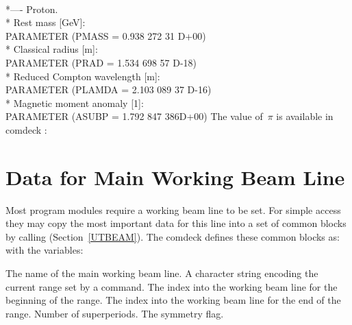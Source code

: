 {      \>\\
{*}---- \>Proton.\\
{*}     \>Rest mass [GeV]:\\
      \>PARAMETER         (PMASS  = 0.938 272 31 D+00)\\
{*}     \>Classical radius [m]:\\
      \>PARAMETER         (PRAD   = 1.534 698 57 D-18)\\
{*}     \>Reduced Compton wavelength [m]:\\
      \>PARAMETER         (PLAMDA = 2.103 089 37 D-16)\\
{*}     \>Magnetic moment anomaly [1]:\\
      \>PARAMETER         (ASUBP  = 1.792 847 386D+00)
}
The value of~$\pi$ is available in comdeck :
 
\section{Data for Main Working Beam Line}
\label{Swline}
Most program modules require a working beam line to be set.
For simple access they may copy the most important data for this
line into a set of common blocks by calling 
(Section~\ref{UTBEAM}).
The comdeck  defines these common blocks as:
with the variables:
\begin{mylist}
The name of the main working beam line.
A character string encoding the current range set by a 
command.
The index into the working beam line for the beginning of the range.
The index into the working beam line for the end of the range.
Number of superperiods.
The symmetry flag.
\end{mylist}
 
